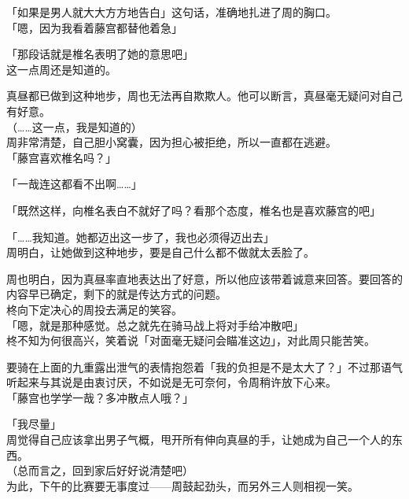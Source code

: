 「如果是男人就大大方方地告白」这句话，准确地扎进了周的胸口。\\

「嗯，因为我看着藤宫都替他着急」

「那段话就是椎名表明了她的意思吧」\\

这一点周还是知道的。

真昼都已做到这种地步，周也无法再自欺欺人。他可以断言，真昼毫无疑问对自己有好意。\\

（……这一点，我是知道的）\\

周非常清楚，自己胆小窝囊，因为担心被拒绝，所以一直都在逃避。\\

「藤宫喜欢椎名吗？」

「一哉连这都看不出啊……」

「既然这样，向椎名表白不就好了吗？看那个态度，椎名也是喜欢藤宫的吧」

「……我知道。她都迈出这一步了，我也必须得迈出去」\\

周明白，让她做到这种地步，要是自己什么都不做就太丢脸了。

周也明白，因为真昼率直地表达出了好意，所以他应该带着诚意来回答。要回答的内容早已确定，剩下的就是传达方式的问题。\\

柊向下定决心的周投去满足的笑容。\\

「嗯，就是那种感觉。总之就先在骑马战上将对手给冲散吧」\\

柊不知为何很高兴，笑着说「对面毫无疑问会瞄准这边」，对此周只能苦笑。

要骑在上面的九重露出泄气的表情抱怨着「我的负担是不是太大了？」不过那语气听起来与其说是由衷讨厌，不如说是无可奈何，令周稍许放下心来。\\

「藤宫也学学一哉？多冲散点人哦？」

「我尽量」\\

周觉得自己应该拿出男子气概，甩开所有伸向真昼的手，让她成为自己一个人的东西。\\

（总而言之，回到家后好好说清楚吧）\\

为此，下午的比赛要无事度过——周鼓起劲头，而另外三人则相视一笑。

